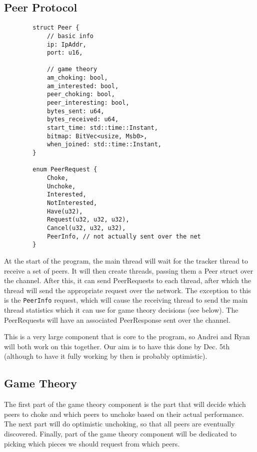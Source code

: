 \documentclass{article}
\begin{document}
    \subsection{Peer Protocol}

    \begin{verbatim}
        struct Peer {
            // basic info
            ip: IpAddr,
            port: u16,

            // game theory
            am_choking: bool,
            am_interested: bool,
            peer_choking: bool,
            peer_interesting: bool,
            bytes_sent: u64,
            bytes_received: u64,
            start_time: std::time::Instant,
            bitmap: BitVec<usize, Msb0>,
            when_joined: std::time::Instant,
        }

        enum PeerRequest {
            Choke,
            Unchoke,
            Interested,
            NotInterested,
            Have(u32),
            Request(u32, u32, u32),
            Cancel(u32, u32, u32),
            PeerInfo, // not actually sent over the net
        }
    \end{verbatim}
    At the start of the program, the main thread will wait for the tracker thread to receive a set of peers.
    It will then create threads, passing them a Peer struct over the channel.
    After this, it can send PeerRequests to each thread, after which the thread will send the appropriate request over the network.
    The exception to this is the \texttt{PeerInfo} request, which will cause the receiving thread to send the main thread statistics which it can use for game theory decisions (see below).
    The PeerRequests will have an associated PeerResponse sent over the channel.

    This is a very large component that is core to the program, so Andrei and Ryan will both work on this together.
    Our aim is to have this done by Dec. 5th (although to have it fully working by then is probably optimistic).

    \subsection{Game Theory}

    The first part of the game theory component is the part that will decide which peers to choke and which peers to unchoke based on their actual performance.
    The next part will do optimistic unchoking, so that all peers are eventually discovered.
    Finally, part of the game theory component will be dedicated to picking which pieces we should request from which peers.
\end{document}
